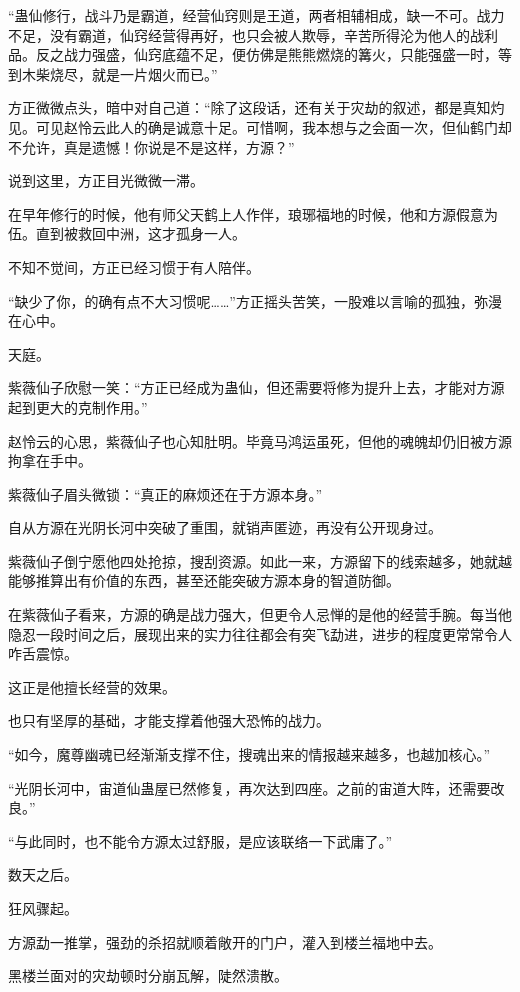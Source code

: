 \begin{this_body}
“蛊仙修行，战斗乃是霸道，经营仙窍则是王道，两者相辅相成，缺一不可。战力不足，没有霸道，仙窍经营得再好，也只会被人欺辱，辛苦所得沦为他人的战利品。反之战力强盛，仙窍底蕴不足，便仿佛是熊熊燃烧的篝火，只能强盛一时，等到木柴烧尽，就是一片烟火而已。”

方正微微点头，暗中对自己道：“除了这段话，还有关于灾劫的叙述，都是真知灼见。可见赵怜云此人的确是诚意十足。可惜啊，我本想与之会面一次，但仙鹤门却不允许，真是遗憾！你说是不是这样，方源？”

说到这里，方正目光微微一滞。

在早年修行的时候，他有师父天鹤上人作伴，琅琊福地的时候，他和方源假意为伍。直到被救回中洲，这才孤身一人。

不知不觉间，方正已经习惯于有人陪伴。

“缺少了你，的确有点不大习惯呢……”方正摇头苦笑，一股难以言喻的孤独，弥漫在心中。

天庭。

紫薇仙子欣慰一笑：“方正已经成为蛊仙，但还需要将修为提升上去，才能对方源起到更大的克制作用。”

赵怜云的心思，紫薇仙子也心知肚明。毕竟马鸿运虽死，但他的魂魄却仍旧被方源拘拿在手中。

紫薇仙子眉头微锁：“真正的麻烦还在于方源本身。”

自从方源在光阴长河中突破了重围，就销声匿迹，再没有公开现身过。

紫薇仙子倒宁愿他四处抢掠，搜刮资源。如此一来，方源留下的线索越多，她就越能够推算出有价值的东西，甚至还能突破方源本身的智道防御。

在紫薇仙子看来，方源的确是战力强大，但更令人忌惮的是他的经营手腕。每当他隐忍一段时间之后，展现出来的实力往往都会有突飞勐进，进步的程度更常常令人咋舌震惊。

这正是他擅长经营的效果。

也只有坚厚的基础，才能支撑着他强大恐怖的战力。

“如今，魔尊幽魂已经渐渐支撑不住，搜魂出来的情报越来越多，也越加核心。”

“光阴长河中，宙道仙蛊屋已然修复，再次达到四座。之前的宙道大阵，还需要改良。”

“与此同时，也不能令方源太过舒服，是应该联络一下武庸了。”

数天之后。

狂风骤起。

方源勐一推掌，强劲的杀招就顺着敞开的门户，灌入到楼兰福地中去。

黑楼兰面对的灾劫顿时分崩瓦解，陡然溃散。


\end{this_body}
